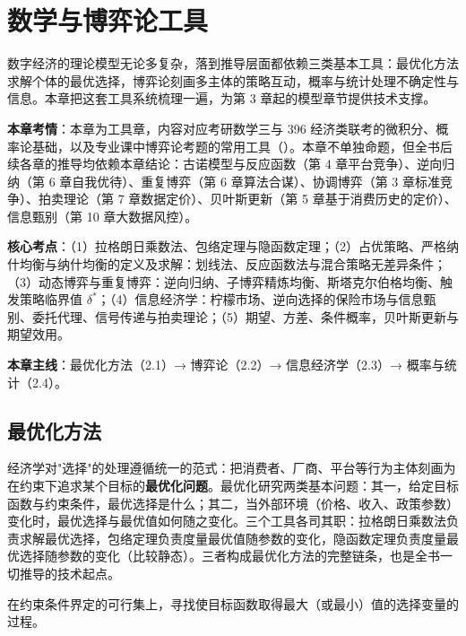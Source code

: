 \chapter{数学与博弈论工具}

数字经济的理论模型无论多复杂，落到推导层面都依赖三类基本工具：最优化方法求解个体的最优选择，博弈论刻画多主体的策略互动，概率与统计处理不确定性与信息。本章把这套工具系统梳理一遍，为第 3 章起的模型章节提供技术支撑。

\begin{examguide}
\textbf{本章考情}：本章为工具章，内容对应考研数学三与 396 经济类联考的微积分、概率论基础，以及专业课中博弈论考题的常用工具（）。本章不单独命题，但全书后续各章的推导均依赖本章结论：古诺模型与反应函数（第 4 章平台竞争）、逆向归纳（第 6 章自我优待）、重复博弈（第 6 章算法合谋）、协调博弈（第 3 章标准竞争）、拍卖理论（第 7 章数据定价）、贝叶斯更新（第 5 章基于消费历史的定价）、信息甄别（第 10 章大数据风控）。

\textbf{核心考点}：（1）拉格朗日乘数法、包络定理与隐函数定理；（2）占优策略、严格纳什均衡与纳什均衡的定义及求解：划线法、反应函数法与混合策略无差异条件；（3）动态博弈与重复博弈：逆向归纳、子博弈精炼均衡、斯塔克尔伯格均衡、触发策略临界值 $\delta^*$；（4）信息经济学：柠檬市场、逆向选择的保险市场与信息甄别、委托代理、信号传递与拍卖理论；（5）期望、方差、条件概率，贝叶斯更新与期望效用。

\textbf{本章主线}：最优化方法（2.1）→ 博弈论（2.2）→ 信息经济学（2.3）→ 概率与统计（2.4）。
\end{examguide}

\section{最优化方法}

经济学对"选择"的处理遵循统一的范式：把消费者、厂商、平台等行为主体刻画为在约束下追求某个目标的\textbf{最优化问题}。最优化研究两类基本问题：其一，给定目标函数与约束条件，最优选择是什么；其二，当外部环境（价格、收入、政策参数）变化时，最优选择与最优值如何随之变化。三个工具各司其职：拉格朗日乘数法负责求解最优选择，包络定理负责度量最优值随参数的变化，隐函数定理负责度量最优选择随参数的变化（比较静态）。三者构成最优化方法的完整链条，也是全书一切推导的技术起点。

\begin{definition}
在约束条件界定的可行集上，寻找使目标函数取得最大（或最小）值的选择变量的过程。
\end{definition}

